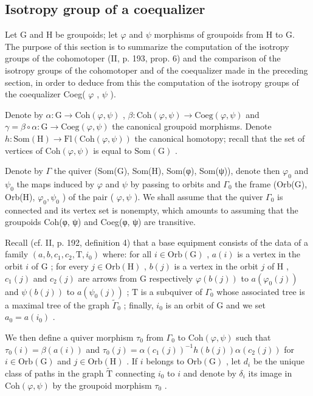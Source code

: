 \subsection{Isotropy group of a coequalizer}

Let G and H be groupoids; let \(\varphi\) and \(\psi\) morphisms of groupoids from H to G. The purpose of this section is to summarize the computation of the isotropy groups of the cohomotoper (II, p. 193, prop. 6) and the comparison of the isotropy groups of the cohomotoper and of the coequalizer made in the preceding section, in order to deduce from this the computation of the isotropy groups of the coequalizer Coeg( \(\varphi\) , \(\psi\) ).

Denote by \(\alpha\colon\mathrm{G}\to\mathrm{Coh}(\varphi,\psi)\) , \(\beta\colon\mathrm{Coh}(\varphi,\psi)\to\mathrm{Coeg}(\varphi,\psi)\) and \(\gamma=\beta\circ\alpha\colon\mathrm{G}\to\mathrm{Coeg}(\varphi,\psi)\) the canonical groupoid morphisms. Denote \(h\colon\mathrm{Som}(\mathrm{H})\to\mathrm{Fl}(\mathrm{Coh}(\varphi,\psi))\) the canonical homotopy; recall that the set of vertices of \(\mathrm{Coh}(\varphi,\psi)\) is equal to \(\mathrm{Som}(\mathrm{G})\) .

Denote by \(\Gamma\) the quiver (Som(G), Som(H), Som(φ), Som(ψ)), denote then \(\varphi_0\) and \(\psi_0\) the maps induced by \(\varphi\) and \(\psi\) by passing to orbits and \(\Gamma_0\) the frame (Orb(G), Orb(H), \(\varphi_0, \psi_0\) ) of the pair ( \(\varphi, \psi\) ). We shall assume that the quiver \(\Gamma_0\) is connected and its vertex set is nonempty, which amounts to assuming that the groupoids Coh(φ, ψ) and Coeg(φ, ψ) are transitive.

Recall (cf. II, p. 192, definition 4) that a base equipment consists of the data of a family \((a, b, c_1, c_2, \mathrm{T}, i_0)\) where: for all \(i \in \mathrm{Orb}(\mathrm{G})\) , \(a(i)\) is a vertex in the orbit \(i\) of \(\mathrm{G}\) ; for every \(j \in \mathrm{Orb}(\mathrm{H})\) , \(b(j)\) is a vertex in the orbit \(j\) of \(\mathrm{H}\) , \(c_1(j)\) and \(c_2(j)\) are arrows from \(\mathrm{G}\) respectively \(\varphi(b(j))\) to \(a(\varphi_0(j))\) and \(\psi(b(j))\) to \(a(\psi_0(j))\) ; \(\mathrm{T}\) is a subquiver of \(\Gamma_0\) whose associated tree is a maximal tree of the graph \(\widetilde{\Gamma}_0\) ; finally, \(i_0\) is an orbit of \(\mathrm{G}\) and we set \(a_0 = a(i_0)\) .

We then define a quiver morphism \(\tau_0\) from \(\Gamma_0\) to \(\mathrm{Coh}(\varphi, \psi)\) such that \(\tau_0(i) = \beta(a(i))\) and \(\tau_0(j) = \alpha(c_1(j))^{-1}h(b(j))\alpha(c_2(j))\) for \(i \in \mathrm{Orb}(\mathrm{G})\) and \(j \in \mathrm{Orb}(\mathrm{H})\) . If \(i\) belongs to \(\mathrm{Orb}(\mathrm{G})\) , let \(d_i\) be the unique class of paths in the graph \(\widetilde{\mathrm{T}}\) connecting \(i_0\) to \(i\) and denote by \(\delta_i\) its image in \(\mathrm{Coh}(\varphi, \psi)\) by the groupoid morphism \(\tau_0\) .

